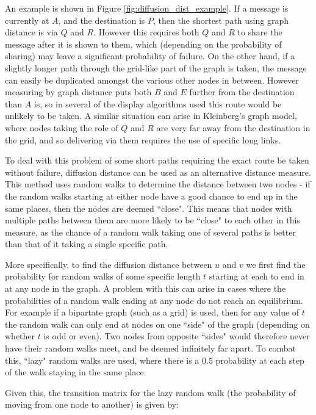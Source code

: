 \documentclass[bsc,frontabs,twoside,singlespacing,parskip,deptreport]{infthesis}     %
\begin{document}
An example is shown in Figure \ref{fig:diffusion_dist_example}. If a message is currently at $A$, and the destination is $P$, then the shortest path using graph distance is via $Q$ and $R$. However this requires both $Q$ and $R$ to share the message after it is shown to them, which (depending on the probability of sharing) may leave a significant probability of failure. On the other hand, if a slightly longer path through the grid-like part of the graph is taken, the message can easily be duplicated amongst the various other nodes in between. However measuring by graph distance puts both $B$ and $E$ further from the destination than $A$ is, so in several of the display algorithms used this route would be unlikely to be taken. A similar situation can arise in Kleinberg's graph model, where nodes taking the role of $Q$ and $R$ are very far away from the destination in the grid, and so delivering via them requires the use of specific long links.

To deal with this problem of some short paths requiring the exact route be taken without failure, diffusion distance can be used as an alternative distance measure. This method uses random walks to determine the distance between two nodes - if the random walks starting at either node have a good chance to end up in the same places, then the nodes are deemed ``close". This means that nodes with multiple paths between them are more likely to be ``close" to each other in this measure, as the chance of a random walk taking one of several paths is better than that of it taking a single specific path.

More specifically, to find the diffusion distance between $u$ and $v$ we first find the probability for random walks of some specific length $t$ starting at each to end in at any node in the graph. A problem with this can arise in cases where the probabilities of a random walk ending at any node do not reach an equilibrium. For example if a bipartate graph (such as a grid) is used, then for any value of $t$ the random walk can only end at nodes on one ``side" of the graph (depending on whether $t$ is odd or even). Two nodes from opposite ``sides" would therefore never have their random walks meet, and be deemed infinitely far apart. To combat this, ``lazy" random walks are used, where there is a 0.5 probability at each step of the walk staying in the same place.

Given this, the transition matrix for the lazy random walk (the probability of moving from one node to another) is given by:
\end{document}

